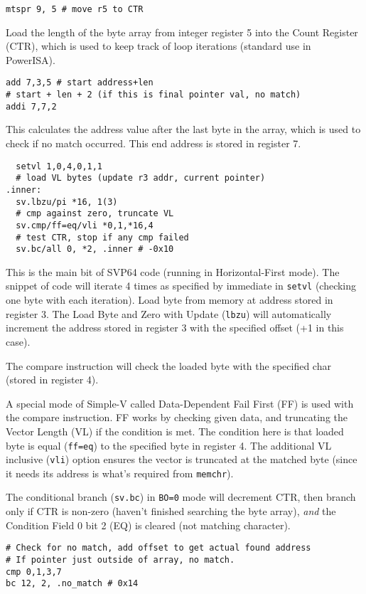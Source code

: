 \begin{verbatim}
mtspr 9, 5 # move r5 to CTR
\end{verbatim}
Load the length of the byte array from integer register 5 into
the Count Register (CTR), which is used to keep track of loop iterations
(standard use in PowerISA).

\begin{verbatim}
add 7,3,5 # start address+len
# start + len + 2 (if this is final pointer val, no match)
addi 7,7,2
\end{verbatim}
This calculates the address value after the last byte in the array, which is
used to check if no match occurred. This end address is stored in register 7.

\begin{verbatim}
  setvl 1,0,4,0,1,1
  # load VL bytes (update r3 addr, current pointer)
.inner:
  sv.lbzu/pi *16, 1(3)
  # cmp against zero, truncate VL
  sv.cmp/ff=eq/vli *0,1,*16,4
  # test CTR, stop if any cmp failed
  sv.bc/all 0, *2, .inner # -0x10
\end{verbatim}
This is the main bit of SVP64 code (running in Horizontal-First mode).
The snippet of code will iterate 4 times as specified by immediate
in \texttt{setvl} (checking one byte with each iteration).
Load byte from memory at address stored in register 3.
The Load Byte and Zero with Update (\texttt{lbzu}) will automatically increment
the address stored in register 3 with the specified offset (+1 in this case).

The compare instruction will check the loaded byte with the specified char
(stored in register 4).

A special mode of Simple-V called Data-Dependent Fail First (FF) is used with
the compare instruction. FF works by checking given data, and truncating the
Vector Length (VL) if the condition is met. The condition here is that
loaded byte is equal (\texttt{ff=eq}) to the specified byte in register 4.
The additional VL inclusive (\texttt{vli}) option ensures the vector is
truncated at the matched byte (since it needs its address is what's required
from \texttt{memchr}).

The conditional branch (\texttt{sv.bc}) in \texttt{BO=0} mode will decrement
CTR, then branch only if CTR is non-zero (haven't finished searching the
byte array), \textit{and} the Condition Field 0 bit 2 (EQ) is cleared
(not matching character).

\begin{verbatim}
# Check for no match, add offset to get actual found address
# If pointer just outside of array, no match.
cmp 0,1,3,7
bc 12, 2, .no_match # 0x14
\end{verbatim}

